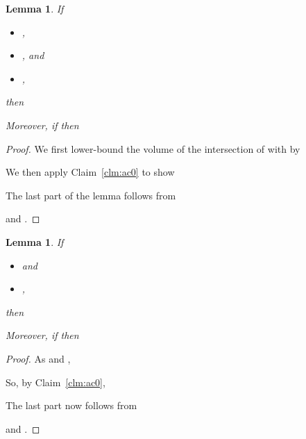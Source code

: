 \documentclass[11pt]{article}
\newtheorem{lemma}[theorem]{Lemma}
\begin{document}
\begin{lemma}\label{lem:ac5}
If
\begin{itemize}
\item [(a)] ,
\item [(b)] , and
\item [(c)] , 
\end{itemize}
 then

Moreover, if 
then

\end{lemma}
\begin{proof}
We first lower-bound the volume of the 
  intersection of  with  by

We then apply Claim~\ref{clm:ac0} to show

The last part of the lemma follows from 
   
  and .  
\end{proof}

\begin{lemma}\label{lem:ac6}
If
\begin{itemize}
\item [(a)]   and
\item [(b)] ,
\end{itemize}
 then

Moreover, if 
then

\end{lemma}
\begin{proof}
As 
   and
 ,

So, by Claim~\ref{clm:ac0},

The last part now follows from

and .
\end{proof}
\end{document}
